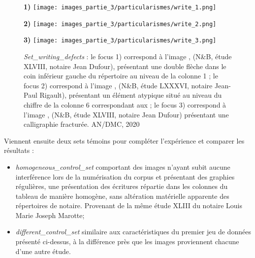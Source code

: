 \newpage
\begin{figure}[H]
    \begin{minipage}[c]{.46\linewidth} 
        \centering
        \textbf{1)}
        \texttt{[image: images\_partie\_3/particularismes/write\_1.png]}
        \end{minipage}
    \hfill%
    \begin{minipage}[c]{.46\linewidth}
        \centering
        \textbf{2)}
        \texttt{[image: images\_partie\_3/particularismes/write\_2.png]}
    \end{minipage}
    \hfill%
    \begin{minipage}[c]{.46\linewidth}
        \centering
        \textbf{3)}
        \texttt{[image: images\_partie\_3/particularismes/write\_3.png]}
    \end{minipage}
        \caption{\textit{Set\_writing\_defects} : le focus 1) correspond à l'image , (N\&B, étude XLVIII, notaire Jean Dufour), présentant une double flèche dans le coin inférieur gauche du répertoire au niveau de la colonne 1 ; le focus 2) correspond à l'image , (N\&B, étude LXXXVI, notaire Jean-Paul Rigault),  présentant un élément atypique situé au niveau du chiffre  de la colonne 6 correspondant aux ; le focus 3) correspond à l'image
        , (N\&B, étude XLVIII, notaire Jean Dufour) présentant une calligraphie fracturée.
        \textcopyright AN/DMC, 2020}
    \label{fig:exemples_write}
\end{figure}
\newpage    
Viennent ensuite deux sets témoins pour compléter l'expérience et comparer les résultats :

\begin{itemize}
    \item \textit{homogeneous\_control\_set} comportant des images n'ayant subit aucune interférence lors de la numérisation du corpus et présentant des graphies régulières, une présentation des écritures répartie dans les colonnes du tableau de manière homogène, sans altération matérielle apparente des répertoires de notaire. Provenant de la même étude XLIII du notaire Louis Marie Joseph Marotte; 
    \item \textit{different\_control\_set} similaire aux caractéristiques du premier jeu de données présenté ci-dessus, à la différence près que les images proviennent chacune d'une autre étude. 
\end{itemize}

